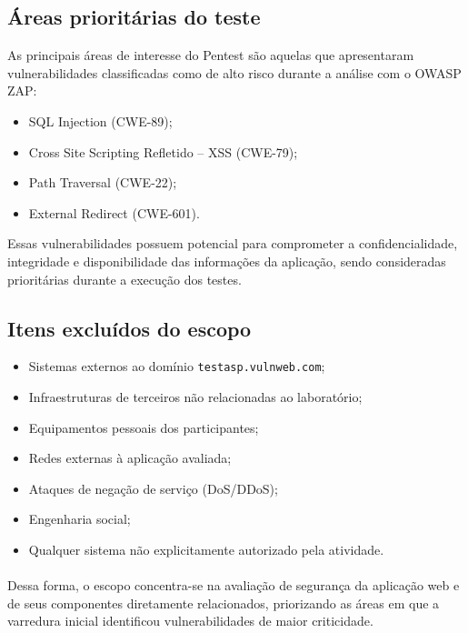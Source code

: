 \subsection{Áreas prioritárias do teste}

As principais áreas de interesse do Pentest são aquelas que apresentaram
vulnerabilidades classificadas como de alto risco durante a análise com o OWASP
ZAP:

\begin{itemize}
\item SQL Injection (CWE-89);
\item Cross Site Scripting Refletido -- XSS (CWE-79);
\item Path Traversal (CWE-22);
\item External Redirect (CWE-601).
\end{itemize}

Essas vulnerabilidades possuem potencial para comprometer a confidencialidade,
integridade e disponibilidade das informações da aplicação, sendo consideradas
prioritárias durante a execução dos testes.

\subsection{Itens excluídos do escopo}

\begin{itemize}
\item Sistemas externos ao domínio \texttt{testasp.vulnweb.com};
\item Infraestruturas de terceiros não relacionadas ao laboratório;
\item Equipamentos pessoais dos participantes;
\item Redes externas à aplicação avaliada;
\item Ataques de negação de serviço (DoS/DDoS);
\item Engenharia social;
\item Qualquer sistema não explicitamente autorizado pela atividade.
\end{itemize}

\paragraph{}
Dessa forma, o escopo concentra-se na avaliação de segurança da aplicação web e
de seus componentes diretamente relacionados, priorizando as áreas em que a
varredura inicial identificou vulnerabilidades de maior criticidade.
